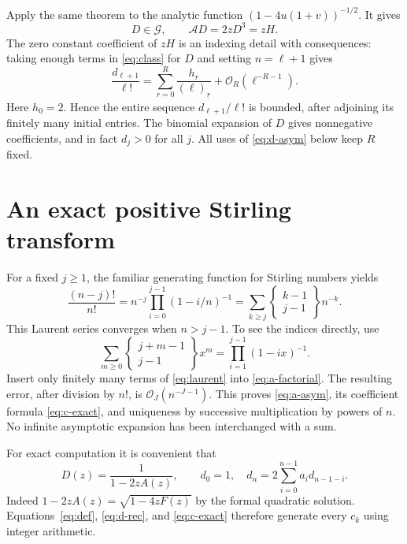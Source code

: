 \documentclass[11pt,letterpaper]{article}
\numberwithin{equation}{section}
\theoremstyle{remark}\newtheorem{remark}[theorem]{Remark}
\newcommand{\Ord}{\mathcal O}
\newcommand{\fall}[2]{(#1)_{\underline{#2}}}
\newcommand{\stir}[2]{\left\{\begin{smallmatrix}#1\\#2\end{smallmatrix}\right\}}
\newcommand{\As}{\mathcal A}
\begin{document}
Apply the same theorem to the analytic function $(1-4u(1+v))^{-1/2}$. It gives
\begin{equation}\label{eq:AD}
 D\in\mathcal G,\qquad \As D=2zD^3=zH.
\end{equation}
The zero constant coefficient of $zH$ is an indexing detail with consequences: taking enough terms in \eqref{eq:class} for $D$ and setting $n=\ell+1$ gives
\begin{equation}\label{eq:d-asym}
 \frac{d_{\ell+1}}{\ell!}
 =\sum_{r=0}^{R}\frac{h_r}{\fall{\ell}{r}}
                      +\Ord_R(\ell^{-R-1}).
\end{equation}
Here $h_0=2$. Hence the entire sequence $d_{\ell+1}/\ell!$ is bounded, after adjoining its finitely many initial entries. The binomial expansion of $D$ gives nonnegative coefficients, and in fact $d_j>0$ for all $j$. All uses of \eqref{eq:d-asym} below keep $R$ fixed.

\section{An exact positive Stirling transform}
\label{sec:stirling}
For a fixed $j\ge1$, the familiar generating function for Stirling numbers yields
\begin{equation}\label{eq:laurent}
 \frac{(n-j)!}{n!}
 =n^{-j}\prod_{i=0}^{j-1}(1-i/n)^{-1}
 =\sum_{k\ge j}\stir{k-1}{j-1}n^{-k}.
\end{equation}
This Laurent series converges when $n>j-1$. To see the indices directly, use
\[
 \sum_{m\ge0}\stir{j+m-1}{j-1}x^m
 =\prod_{i=1}^{j-1}(1-ix)^{-1}.
\]
Insert only finitely many terms of \eqref{eq:laurent} into \eqref{eq:a-factorial}. The resulting error, after division by $n!$, is $\Ord_J(n^{-J-1})$. This proves \eqref{eq:a-asym}, its coefficient formula \eqref{eq:c-exact}, and uniqueness by successive multiplication by powers of $n$. No infinite asymptotic expansion has been interchanged with a sum.

For exact computation it is convenient that
\begin{equation}\label{eq:d-rec}
 D(z)=\frac1{1-2zA(z)},\qquad
 d_0=1,\quad d_n=2\sum_{i=0}^{n-1}a_i d_{n-1-i}.
\end{equation}
Indeed $1-2zA(z)=\sqrt{1-4zF(z)}$ by the formal quadratic solution. Equations~\eqref{eq:def}, \eqref{eq:d-rec}, and \eqref{eq:c-exact} therefore generate every $c_k$ using integer arithmetic.
\end{document}

